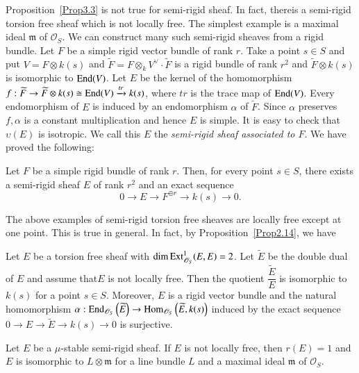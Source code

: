 Proposition~\ref{Prop3.3} is not true for semi-rigid sheaf. In fact,
there\pageoriginale is a semi-rigid torsion free sheaf which is not locally
free. The simplest example is a maximal ideal $\mathfrak{m}$ of
$\mathscr{O}_S$. We can construct many such semi-rigid sheaves from a
rigid bundle. Let $F$ be a simple rigid vector bundle of rank
$r$. Take a point $s\in S$ and put $V=F\otimes k(s)$ and
$\widetilde{F}=F\otimes_k V^{\vee}\cdot \widetilde{F}$ is a rigid
bundle of rank $r^{2}$ and $\widetilde{F}\otimes k(s)$ is isomorphic to
$\mathrm{End}(V)$. Let $E$ be the kernel of the homomorphism
$f:\widetilde{F}\to \widetilde{F}\otimes k(s)\cong
\mathrm{End}(V)\xrightarrow{tr}k(s)$, where $tr$ is the trace map of
$\mathrm{End}(V)$. Every endomorphism of $E$ is induced by an endomorphism
$\alpha$ of $\widetilde{F}$. Since $\alpha$ preserves $f,\alpha$ is a
constant multiplication and hence $E$ is simple. It is easy to check
that $\upsilon(E)$ is isotropic. We call this $E$
the \textit{semi-rigid sheaf associated to $F$}. We have proved the
following:             

\begin{Prop}\label{Prop3.8}
Let $F$ be a simple rigid bundle of rank $r$. Then, for every point
$s\in S$, there exists a semi-rigid sheaf $E$ of rank $r^{2}$ and an
exact sequence 
$$
0\to E\to F^{\oplus r}\to k(s)\to 0.
$$
\end{Prop}

The above examples of semi-rigid torsion free sheaves are locally free
except at one point. This is true in general. In fact, by
Proposition~\ref{Prop2.14}, we have 

\begin{Prop}\label{Prop3.9}
Let $E$ be a torsion free sheaf with
$\dim \mathrm{Ext}^{1}_{\mathscr{O}_S}(E,E)=2$. Let $\widetilde{E}$ be the
double dual of $E$ and assume that\pageoriginale $E$ is not locally free. Then the
quotient $\dfrac{\widetilde{E}}{E}$ is isomorphic to $k(s)$ for a
point $s\in S$. Moreover, $E$ is a rigid vector bundle and the natural
homomorphism
$\alpha:\mathrm{End}_{\mathscr{O}_S}\left(\widetilde{E}\right)\to \mathrm{Hom}_{\mathscr{O}_S}\left(\widetilde{E},
k(s)\right)$ induced by the exact sequence $0\to E\to \widetilde{E}\to
k(s)\to 0$ is surjective.
\end{Prop}

\begin{cor}\label{cor3.10}
Let $E$ be a $\mu$-stable semi-rigid sheaf. If $E$ is not locally
free, then $r(E)=1$ and $E$ is isomorphic to $L\otimes\mathfrak{m}$
for a line bundle $L$ and a maximal ideal $\mathfrak{m}$ of
$\mathscr{O}_S$. 
\end{cor}

